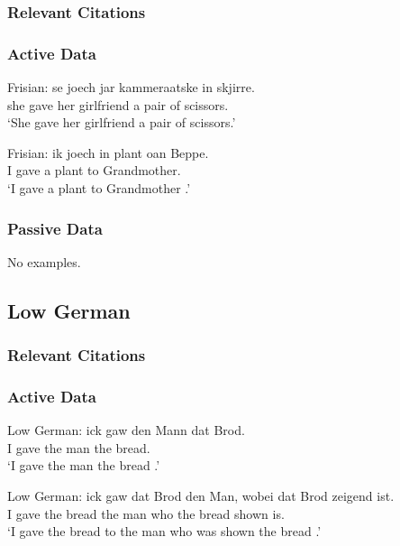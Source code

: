 \subsubsection{Relevant Citations}
\cite{Tiersma.1985}
\subsubsection{Active Data}
\begin{exe}
	 Frisian:
		\gll se joech jar kammeraatske in skjirre.\\
		she gave her girlfriend a {pair of scissors}.\\
		\trans `She gave her girlfriend a pair of scissors.'

	 Frisian:
		\gll ik joech in plant oan Beppe.\\
		I gave a plant to Grandmother.\\
		\trans `I gave a plant to Grandmother \citep{Tiersma.1985}.'

\end{exe}
\subsubsection{Passive Data}
No examples.

\subsection{Low German}
\subsubsection{Relevant Citations}
\cite{Mussaus.1829,Lasch.1914,Keseling.1970,Ponelis.1979,Ponelis.1993,Boden.1993,Lindow.1998,Appel.2007}
\subsubsection{Active Data}
\begin{exe}
	 Low German:
		\gll ick gaw den Mann dat Brod.\\
		I gave the man the bread.\\
		\trans `I gave the man the bread \citep{Mussaus.1829}.'

	 Low German:
		\gll ick gaw dat Brod den Man, wobei dat Brod zeigend ist.\\
		I gave the bread the man who the bread shown is.\\
		\trans `I gave the bread to the man who was shown the bread \citep{Mussaus.1829}.'
\end{exe}

